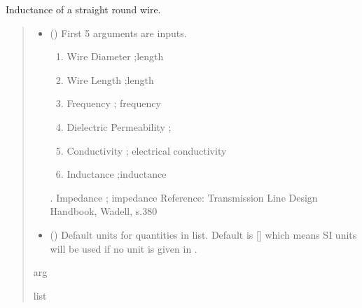 \documentclass[letterpaper,10pt,english]{sphinxmanual}
\begin{document}

\begin{fulllineitems}
\label{\detokenize{components:components.L_StraightRoundWire}}
\pysigstartsignatures
{}
\pysigstopsignatures
\sphinxAtStartPar
Inductance of a straight round wire.
\begin{quote}\begin{description}
\begin{itemize}
\item {} 
\sphinxAtStartPar
{} () \textendash{} 
\sphinxAtStartPar
First 5 arguments are inputs.
\begin{enumerate}
%
\item {} 
\sphinxAtStartPar
Wire Diameter ;length

\item {} 
\sphinxAtStartPar
Wire Length ;length

\item {} 
\sphinxAtStartPar
Frequency ; frequency

\item {} 
\sphinxAtStartPar
Dielectric Permeability  ;

\item {} 
\sphinxAtStartPar
Conductivity ; electrical conductivity

\item {} 
\sphinxAtStartPar
Inductance ;inductance

\end{enumerate}

. Impedance ; impedance
Reference:  Transmission Line Design Handbook, Wadell, s.380


\item {} 
\sphinxAtStartPar
{} (\sphinxstyleliteralemphasis{\sphinxupquote{, }}) \textendash{} Default units for quantities in  list. Default is {[}{]} which means SI units will be used if no unit is given in .

\end{itemize}

\sphinxAtStartPar
arg

\sphinxAtStartPar
list

\end{description}\end{quote}

\end{fulllineitems}
\end{document}
